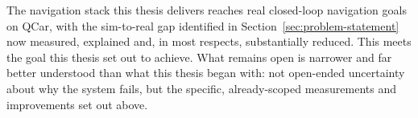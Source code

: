The navigation stack this thesis delivers reaches real closed-loop
navigation goals on QCar, with the sim-to-real gap identified in
Section~\ref{sec:problem-statement} now measured, explained and, in
most respects, substantially reduced. This meets the goal this thesis
set out to achieve. What remains open is narrower and far better
understood than what this thesis began with: not open-ended
uncertainty about why the system fails, but the specific,
already-scoped measurements and improvements set out above.
